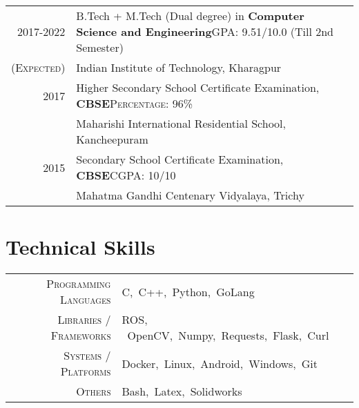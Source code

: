 \documentclass[a4paper,10pt]{extarticle} %
\begin{document}
  \begin{tabular}{r|p{17.5cm}}	
  2017-2022 & B.Tech + M.Tech (Dual degree) in \textbf{Computer Science and Engineering}\hfill\textsc{GPA: } 9.51/10.0 (Till 2nd Semester)\\
  \textsc{(Expected)}& Indian Institute of Technology, Kharagpur \hfill\\
  2017 & Higher Secondary School Certificate Examination, \textbf{CBSE}\hfill\textsc{Percentage: } 96\% \\
  & Maharishi International Residential School, Kancheepuram \hfill\\
  2015 & Secondary School Certificate Examination, \textbf{CBSE}\hfill\textsc{CGPA: } 10/10 \\
  & Mahatma Gandhi Centenary Vidyalaya, Trichy \hfill\\
  \end{tabular}
  
  \section{\textcolor{primary}{Technical Skills}}
  
  \begin{tabular}{r|p{15cm}}
  \textsc{Programming Languages} & C,\ C++,\ Python,\ GoLang \\
  \textsc{Libraries / Frameworks} & ROS, \ OpenCV,\ Numpy,\ Requests,\ Flask,\ Curl \\
  \textsc{Systems / Platforms} & Docker,\ Linux,\ Android,\ Windows,\ Git \\
  \textsc{Others} & Bash,\ Latex,\ Solidworks \\
  \end{tabular}
  
\end{document}
